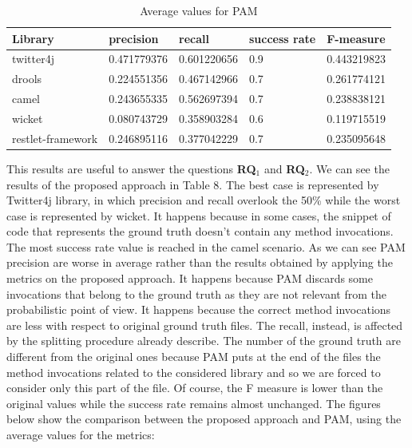  
 
 \begin{table}[!h]
	\begin{tabular}{|p{3.5cm}|p{2.0cm}|p{2.0cm}|p{2.5cm}|p{2.0cm}|}\hline
	 \textbf{Library} & \textbf{precision}  & \textbf{recall} & \textbf{success rate} & \textbf{F-measure} \\ \hline
	 twitter4j & 0.471779376  & 0.601220656 & 0.9  & 0.443219823  \\ \hline
	 drools & 0.224551356 & 0.467142966   & 0.7 & 0.261774121 \\ \hline
	 camel & 0.243655335  & 0.562697394 & 0.7 & 0.238838121 \\ \hline 
	 wicket &0.080743729  & 0.358903284 &  0.6 & 0.119715519  \\ \hline
	 restlet-framework & 0.246895116  & 0.377042229 & 0.7 & 0.235095648 \\ \hline
	\end{tabular}
	 \caption{ Average values for PAM}\label{Table:4}
\end{table} 


This results are useful to answer the questions \textbf{RQ$_1$} and \textbf{RQ$_2$}. We can see the results of the proposed approach in Table 8. The best case is represented by Twitter4j library, in which precision and recall overlook the 50\% while the worst case is represented by wicket. It happens because in some cases, the snippet of code that represents the ground truth doesn't contain any method invocations. The most success rate value is reached in the camel scenario.
As we can see PAM precision are worse in average rather than the results obtained by applying the metrics on the proposed approach. It happens because PAM discards some invocations that belong to the ground truth as they are not relevant from the probabilistic point of view. It happens because the correct method invocations are less with respect to original ground truth files. The recall, instead, is affected by the splitting procedure already describe. The number of the ground truth are different from the original ones because PAM puts at the end of the files the method invocations related to the considered library and so we are forced to consider only this part of the file. Of course, the F measure is lower than the original values while the success rate remains almost unchanged. The figures below show the comparison between the proposed approach and PAM, using the average values for the metrics:\\

